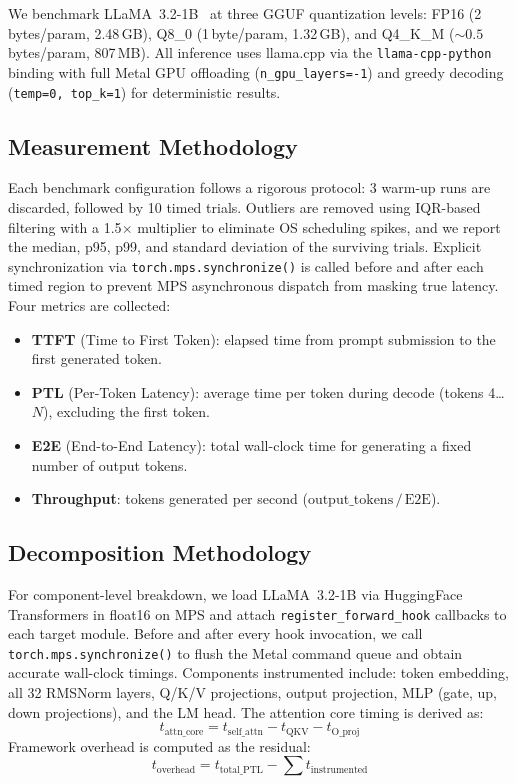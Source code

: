 \documentclass[conference]{IEEEtran}
\begin{document}
We benchmark LLaMA~3.2-1B~\cite{grattafiori2024} at three GGUF quantization levels: FP16 (2\,bytes/param, 2.48\,GB), Q8\_0 (1\,byte/param, 1.32\,GB), and Q4\_K\_M (${\sim}0.5$\,bytes/param, 807\,MB). All inference uses llama.cpp via the \texttt{llama-cpp-python} binding with full Metal GPU offloading (\texttt{n\_gpu\_layers=-1}) and greedy decoding (\texttt{temp=0, top\_k=1}) for deterministic results.

\subsection{Measurement Methodology}

Each benchmark configuration follows a rigorous protocol: 3 warm-up runs are discarded, followed by 10 timed trials. Outliers are removed using IQR-based filtering with a 1.5$\times$ multiplier to eliminate OS scheduling spikes, and we report the median, p95, p99, and standard deviation of the surviving trials. Explicit synchronization via \texttt{torch.mps.synchronize()} is called before and after each timed region to prevent MPS asynchronous dispatch from masking true latency. Four metrics are collected:

\begin{itemize}
  \item \textbf{TTFT} (Time to First Token): elapsed time from prompt submission to the first generated token.
  \item \textbf{PTL} (Per-Token Latency): average time per token during decode (tokens 4\ldots$N$), excluding the first token.
  \item \textbf{E2E} (End-to-End Latency): total wall-clock time for generating a fixed number of output tokens.
  \item \textbf{Throughput}: tokens generated per second ($\text{output\_tokens}\,/\,\text{E2E}$).
\end{itemize}

\subsection{Decomposition Methodology}

For component-level breakdown, we load LLaMA~3.2-1B via HuggingFace Transformers in float16 on MPS and attach \texttt{register\_forward\_hook} callbacks to each target module. Before and after every hook invocation, we call \texttt{torch.mps.synchronize()} to flush the Metal command queue and obtain accurate wall-clock timings. Components instrumented include: token embedding, all 32 RMSNorm layers, Q/K/V projections, output projection, MLP (gate, up, down projections), and the LM head. The attention core timing is derived as:
\begin{equation}
  t_{\text{attn\_core}} = t_{\text{self\_attn}} - t_{\text{QKV}} - t_{\text{O\_proj}}
\end{equation}
Framework overhead is computed as the residual:
\begin{equation}
  t_{\text{overhead}} = t_{\text{total\_PTL}} - \sum t_{\text{instrumented}}
\end{equation}
\end{document}
